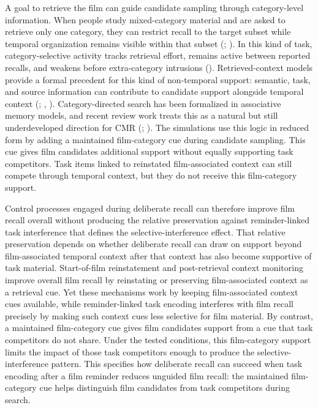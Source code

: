 \documentclass[
  man,
  floatsintext,
  longtable,
  nolmodern,
  notxfonts,
  notimes,
  draftfirst,
  colorlinks=true,linkcolor=blue,citecolor=blue,urlcolor=blue]{apa7}
\begin{document}
A goal to retrieve the film can guide candidate sampling through
category-level information. When people study mixed-category material
and are asked to retrieve only one category, they can restrict recall to
the target subset while temporal organization remains visible within
that subset (;
). In this kind of
task, category-selective activity tracks retrieval effort, remains
active between reported recalls, and weakens before extra-category
intrusions ().
Retrieved-context models provide a formal precedent for this kind of
non-temporal support: semantic, task, and source information can
contribute to candidate support alongside temporal context
(;
,
). Category-directed search has been
formalized in associative memory models, and recent review work treats
this as a natural but still underdeveloped direction for CMR
(;
). The
simulations use this logic in reduced form by adding a maintained
film-category cue during candidate sampling. This cue gives film
candidates additional support without equally supporting task
competitors. Task items linked to reinstated film-associated context can
still compete through temporal context, but they do not receive this
film-category support.

Control processes engaged during deliberate recall can therefore improve
film recall overall without producing the relative preservation against
reminder-linked task interference that defines the
selective-interference effect. That relative preservation depends on
whether deliberate recall can draw on support beyond film-associated
temporal context after that context has also become supportive of task
material. Start-of-film reinstatement and post-retrieval context
monitoring improve overall film recall by reinstating or preserving
film-associated context as a retrieval cue. Yet these mechanisms work by
keeping film-associated context cues available, while reminder-linked
task encoding interferes with film recall precisely by making such
context cues less selective for film material. By contrast, a maintained
film-category cue gives film candidates support from a cue that task
competitors do not share. Under the tested conditions, this
film-category support limits the impact of those task competitors enough
to produce the selective-interference pattern. This specifies how
deliberate recall can succeed when task encoding after a film reminder
reduces unguided film recall: the maintained film-category cue helps
distinguish film candidates from task competitors during search.
\end{document}
